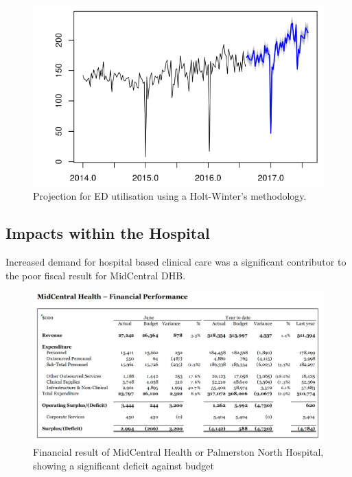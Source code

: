 \documentclass[11pt,a4paper]{article}
\begin{document}
\begin{figure}[htp]
\centering
\includegraphics[scale=0.70]{HW_projections.png}
\caption{Projection for ED utilisation using a Holt-Winter's methodology.}
\label{Projections for ED utilisation through to 2017}
\end{figure}

\subsection{Impacts within the Hospital}
Increased demand for hospital based clinical care was a significant contributor to the poor fiscal result for MidCentral DHB.\\

\begin{figure}[htp]
\centering
\includegraphics[scale=0.30]{MCHbalance.png}
\caption{Financial result of MidCentral Health or Palmerston North Hospital, showing a significant deficit against budget }
\label{Financial result for MidCentral Health - Palmerston North Hospital}
\end{figure}
\end{document}

